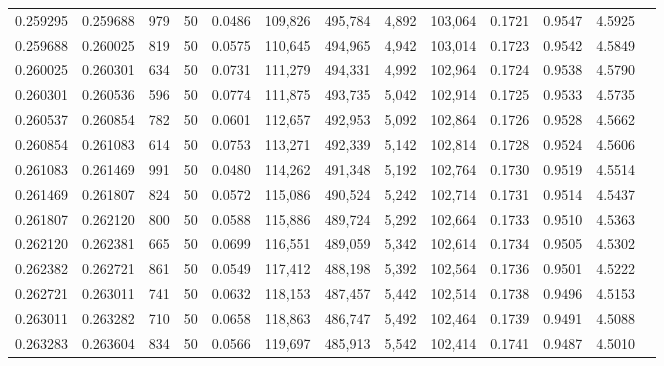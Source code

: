 \begin{tabular}{rrrrrrrrrrrrr}
0.259295 & 0.259688 &   979 &  50 &                                     0.0486 & 109,826 & 495,784 &   4,892 & 103,064 & 0.1721 & 0.9547 & 4.5925 \\
0.259688 & 0.260025 &   819 &  50 &                                     0.0575 & 110,645 & 494,965 &   4,942 & 103,014 & 0.1723 & 0.9542 & 4.5849 \\
0.260025 & 0.260301 &   634 &  50 &                                     0.0731 & 111,279 & 494,331 &   4,992 & 102,964 & 0.1724 & 0.9538 & 4.5790 \\
0.260301 & 0.260536 &   596 &  50 &                                     0.0774 & 111,875 & 493,735 &   5,042 & 102,914 & 0.1725 & 0.9533 & 4.5735 \\
0.260537 & 0.260854 &   782 &  50 &                                     0.0601 & 112,657 & 492,953 &   5,092 & 102,864 & 0.1726 & 0.9528 & 4.5662 \\
0.260854 & 0.261083 &   614 &  50 &                                     0.0753 & 113,271 & 492,339 &   5,142 & 102,814 & 0.1728 & 0.9524 & 4.5606 \\
0.261083 & 0.261469 &   991 &  50 &                                     0.0480 & 114,262 & 491,348 &   5,192 & 102,764 & 0.1730 & 0.9519 & 4.5514 \\
0.261469 & 0.261807 &   824 &  50 &                                     0.0572 & 115,086 & 490,524 &   5,242 & 102,714 & 0.1731 & 0.9514 & 4.5437 \\
0.261807 & 0.262120 &   800 &  50 &                                     0.0588 & 115,886 & 489,724 &   5,292 & 102,664 & 0.1733 & 0.9510 & 4.5363 \\
0.262120 & 0.262381 &   665 &  50 &                                     0.0699 & 116,551 & 489,059 &   5,342 & 102,614 & 0.1734 & 0.9505 & 4.5302 \\
0.262382 & 0.262721 &   861 &  50 &                                     0.0549 & 117,412 & 488,198 &   5,392 & 102,564 & 0.1736 & 0.9501 & 4.5222 \\
0.262721 & 0.263011 &   741 &  50 &                                     0.0632 & 118,153 & 487,457 &   5,442 & 102,514 & 0.1738 & 0.9496 & 4.5153 \\
0.263011 & 0.263282 &   710 &  50 &                                     0.0658 & 118,863 & 486,747 &   5,492 & 102,464 & 0.1739 & 0.9491 & 4.5088 \\
0.263283 & 0.263604 &   834 &  50 &                                     0.0566 & 119,697 & 485,913 &   5,542 & 102,414 & 0.1741 & 0.9487 & 4.5010 \\

\end{tabular}
